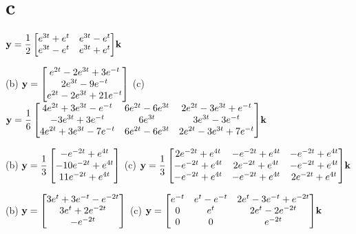 \part{c}
$\displaystyle\mathbf{y}={\frac{1}{2}\begin{bmatrix}e^{3t}+e^t&e^{3t}-e^t
\\e^{3t}-e^t&e^{3t}+e^t\end{bmatrix}}\mathbf{k}$

\medskip

(b)
$\mathbf{y
}=\displaystyle{\begin{bmatrix}e^{2t}-2e^{3t}+3e^{-t}\\2e^{3t}-9e^{-t}\\
e^{2t}-2e^{3t}+21e^{-t}\end{bmatrix}}$
 \hspace*{10pt} (c)
$\mathbf{y}=
\displaystyle{\frac{1}{6}\begin{bmatrix}4e^{2t}+3e^{3t}-e^{-t}&6e^{2t}-6e^{3t}
&2e^{2t}-3e^{3t}+e^{-t}
\\-3e^{3t}+3e^{-t}&6e^{3t}&3e^{3t}-3e^{-t}\\
4e^{2t}+3e^{3t}-7e^{-t}&6e^{2t}-6e^{3t}&2e^{2t}-3e^{3t}+7e^{-t}
\end{bmatrix}}\mathbf{k}$

\medskip

(b)
$\mathbf{y
}=\displaystyle{\frac{1}{3}\begin{bmatrix}-e^{-2t}+e^{4t}\\-10e^{-2t}+e^{4t}\\
11e^{-2t}+e^{4t}\end{bmatrix}}$
 (c)
$\mathbf{y}=
\displaystyle{\frac{1}{3}\begin{bmatrix}2e^{-2t}+e^{4t}&-e^{-2t}+e^{4t}
&-e^{-2t}+e^{4t}
\\-e^{-2t}+e^{4t}&2e^{-2t}+e^{4t}&-e^{-2t}+e^{4t}\\
-e^{-2t}+e^{4t}&-e^{-2t}+e^{4t}&2e^{-2t}+e^{4t}
\end{bmatrix}}\mathbf{k}$

\medskip

(b)
$\mathbf{y
}=\displaystyle{\begin{bmatrix}3e^t+3e^{-t}-e^{-2t}\\3e^t+2e^{-2t}\\
-e^{-2t}\end{bmatrix}}$
\hspace*{10pt}\;   (c)
$\mathbf{y}=\displaystyle{\begin{bmatrix}e^{-t}&e^t-e^{-t}
&2e^t-3e^{-t}+e^{-2t}\\0&e^t&2e^t-2e^{-2t}\\
0&0&e^{-2t}\end{bmatrix}}\mathbf{k}$


